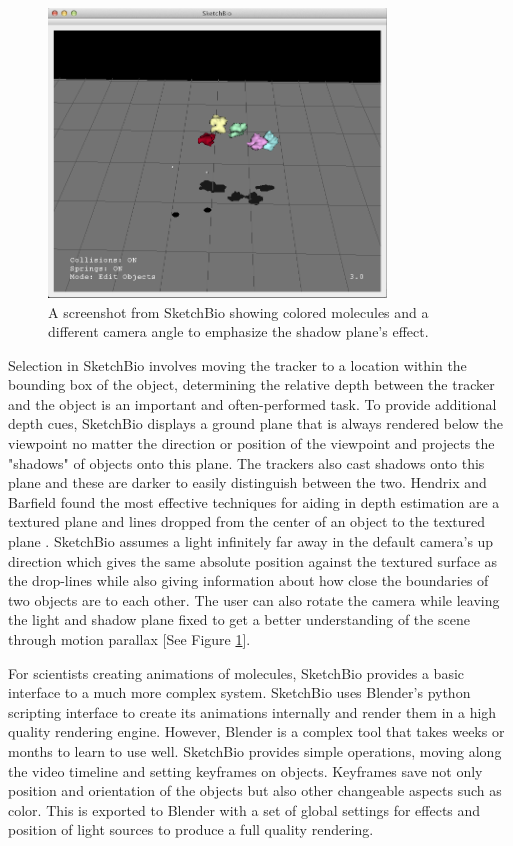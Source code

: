 \documentclass{article} %
\begin{document}
\begin{figure}[h]
\centering
\includegraphics[width=0.8\textwidth]{shadow_plane.png}
\caption{A screenshot from SketchBio showing colored molecules and a different camera angle to emphasize the shadow plane's effect.}
\label{fig:shadow_plane}
\end{figure}

Selection in SketchBio involves moving the tracker to a location within the bounding box of the object, determining the relative depth between the tracker and the object is an important and often-performed task.  To provide additional depth cues, SketchBio displays a ground plane that is always rendered below the viewpoint no matter the direction or position of the viewpoint and projects the "shadows" of objects onto this plane.  The trackers also cast shadows onto this plane and these are darker to easily distinguish between the two.  Hendrix and Barfield found the most effective techniques for aiding in depth estimation are a textured plane and lines dropped from the center of an object to the textured plane \cite{Hendrix1995103}.  SketchBio assumes a light infinitely far away in the default camera's up direction which gives the same absolute position against the textured surface as the drop-lines while also giving information about how close the boundaries of two objects are to each other.  The user can also rotate the camera while leaving the light and shadow plane fixed to get a better understanding of the scene through motion parallax [See Figure \ref{fig:shadow_plane}].

For scientists creating animations of molecules, SketchBio provides a basic interface to a much more complex system.  SketchBio uses Blender's python scripting interface to create its animations internally and render them in a high quality rendering engine.  However, Blender is a complex tool that takes weeks or months to learn to use well.  SketchBio provides simple operations, moving along the video timeline and setting keyframes on objects.  Keyframes save not only position and orientation of the objects but also other changeable aspects such as color.  This is exported to Blender with a set of global settings for effects and position of light sources to produce a full quality rendering.
\end{document}
